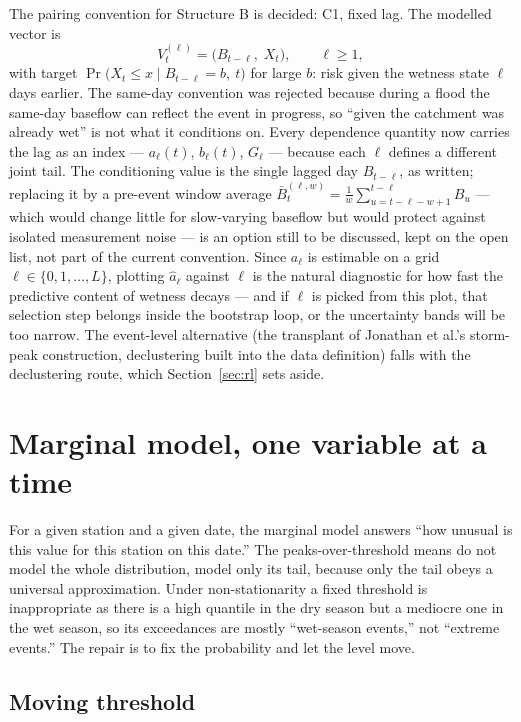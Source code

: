 \documentclass[11pt]{article}
\begin{document}
The pairing convention for Structure B is decided: C1, fixed lag. The modelled vector is
\begin{equation}\label{eq:strB}
V_t^{(\ell)} = \bigl(B_{t-\ell},\; X_t\bigr), \qquad \ell \ge 1,
\end{equation}
with target $\Pr\bigl(X_t \le x \mid B_{t-\ell} = b,\ t\bigr)$ for large $b$: risk given the wetness state $\ell$ days earlier. The same-day convention was rejected because during a flood the same-day baseflow can reflect the event in progress, so ``given the catchment was already wet'' is not what it conditions on. Every dependence quantity now carries the lag as an index --- $a_\ell(t)$, $b_\ell(t)$, $G_\ell$ --- because each $\ell$ defines a different joint tail. {\color{blue}The conditioning value is the single lagged day $B_{t-\ell}$, as written; replacing it by a pre-event window average $\bar B_t^{(\ell,w)} = \frac{1}{w}\sum_{u=t-\ell-w+1}^{t-\ell} B_u$ --- which would change little for slow-varying baseflow but would protect against isolated measurement noise --- is an option still to be discussed, kept on the open list, not part of the current convention.} Since $a_\ell$ is estimable on a grid $\ell \in \{0, 1, \ldots, L\}$, plotting $\hat a_\ell$ against $\ell$ is the natural diagnostic for how fast the predictive content of wetness decays --- and if $\ell$ is picked from this plot, that selection step belongs inside the bootstrap loop, or the uncertainty bands will be too narrow. The event-level alternative (the transplant of Jonathan et al.'s storm-peak construction, declustering built into the data definition) falls with the declustering route, which Section~\ref{sec:rl} sets aside.

\section{Marginal model, one variable at a time}\label{sec:marg}

For a given station and a given date, the marginal model answers ``how unusual is this value for this station on this date.'' The peaks-over-threshold means do not model the whole distribution, model only its tail, because only the tail obeys a universal approximation. Under non-stationarity a fixed threshold is inappropriate as there is a high quantile in the dry season but a mediocre one in the wet season, so its exceedances are mostly ``wet-season events,'' not ``extreme events.'' The repair is to fix the probability and let the level move.

\subsection{Moving threshold}\label{sec:threshold}
\end{document}
